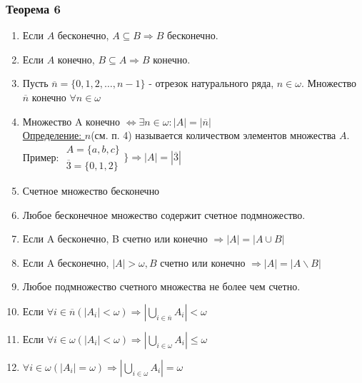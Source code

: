 \documentclass[12pt]{article}
\begin{document}
    \subsubsection*{Теорема 6}\label{th:6}
    \begin{enumerate}
        \item Если $A$ бесконечно, $A \subseteq B \Rightarrow B$ бесконечно.
        \item Если $A$ конечно, $B \subseteq A \Rightarrow B$ конечно.
        \item Пусть $\overline{n}=\{0,1,2,\dots,n-1\}$ - отрезок натурального ряда, $n \in \omega$. Множество
        $\overline{n}$ конечно $\forall n \in \omega$
        \item Множество A конечно $\Leftrightarrow \exists n \in \omega: |A|=|\overline{n}|$\\
            \underline{Определение: } $n$(см. п. 4) называется количеством элементов множества $A$.\\
            Пример: 
            $\begin{matrix}
                A = \{a,b,c\}\\
                \overline{3}=\{0,1,2\}    
            \end{matrix} \Big\} \Rightarrow |A|=|\overline{3}|$
        \item Счетное множество бесконечно
        \item Любое бесконечное множество содержит счетное подмножество.
        \item Если A бесконечно, B счетно или конечно $\Rightarrow |A| = |A \cup B|$
        \item Если A бесконечно, $|A|> \omega, B$ счетно или конечно $\Rightarrow |A|=|A\backslash B|$
        \item Любое подмножество счетного множества не более чем счетно.
        \item Если $\forall i \in \overline{n} (|A_i|< \omega) \Rightarrow |\underset{i \in \overline{n}}{\bigcup} A_i| < \omega$
        \item Если $\forall i \in \omega (|A_i|< \omega) \Rightarrow |\underset{i \in \omega}{\bigcup} A_i| \leq \omega$
        \item $\forall i \in \omega (|A_i|=\omega) \Rightarrow |\underset{i \in \omega}{\bigcup}A_i|= \omega$
    \end{enumerate}
\end{document}
